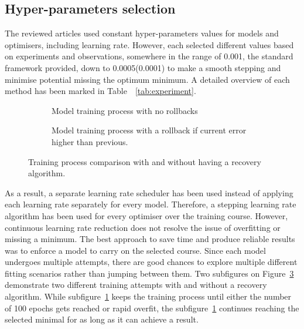 \subsection{Hyper-parameters selection} \label{subsec:l-rate}
%
The reviewed articles used constant hyper-parameters values for models and optimisers, including learning rate.
However, each selected different values based on experiments and observations, somewhere in the range of 0.001, the standard framework provided, down to 0.0005(0.0001) to make a smooth stepping and minimise potential missing the optimum minimum.
A detailed overview of each method has been marked in \mbox{Table ~\ref{tab:experiment}}.

%
\begin{figure}[htbp]
  \centering
  \begin{subfigure}[b]{0.45\textwidth}
      \centering
      
      \caption{Model training process with no rollbacks}
      \label{subfig:no-rollback}
  \end{subfigure}
  \hfill
  \begin{subfigure}[b]{0.45\textwidth}
      \centering
      
      \caption{Model training process with a rollback if current error higher than previous.}
      \label{subfig:rollback}
  \end{subfigure}
  \caption{Training process comparison with and without having a recovery algorithm.}
  \label{fig:rollback}
\end{figure}
As a result, a separate learning rate scheduler has been used instead of applying each learning rate separately for every model.
Therefore, a stepping learning rate algorithm has been used for every optimiser over the training course.
However, continuous learning rate reduction does not resolve the issue of overfitting or missing a minimum.
The best approach to save time and produce reliable results was to enforce a model to carry on the selected course.
Since each model undergoes multiple attempts, there are good chances to explore multiple different fitting scenarios rather than jumping between them.
Two subfigures on \mbox{Figure~\ref{fig:rollback}} demonstrate two different training attempts with and without a recovery algorithm.
While subfigure~\ref{subfig:no-rollback} keeps the training process until either the number of 100 epochs gets reached or rapid overfit, the subfigure~\ref{subfig:no-rollback} continues reaching the selected minimal for as long as it can achieve a result.
